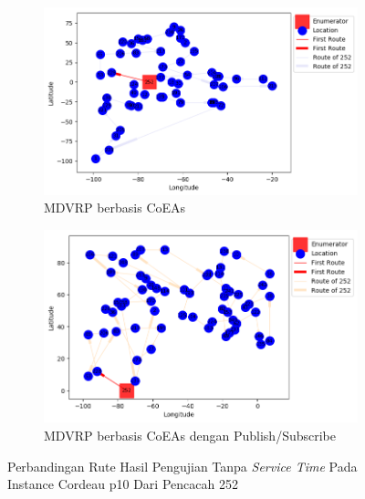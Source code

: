 \begin{figure}[H]
	\centering
	\begin{subfigure}[t]{\textwidth}
		\centering
		\includegraphics[width=\textwidth]{Resources/Images/cordeau_p10/cordeau_p10_notw_252_coes}
		\caption{MDVRP berbasis CoEAs}
		\label{fig:cordeau_p10_notw_252_coes}
	\end{subfigure}
	\begin{subfigure}[t]{\textwidth}
		\centering
		\includegraphics[width=\textwidth]{Resources/Images/cordeau_p10/cordeau_p10_notw_252_pubsub_coes}
		\caption{MDVRP berbasis CoEAs dengan Publish/Subscribe}
		\label{fig:cordeau_p10_notw_252_pubsub_coes}
	\end{subfigure}
	\caption{Perbandingan Rute Hasil Pengujian Tanpa \textit{Service Time} Pada Instance Cordeau p10 Dari Pencacah 252}
	\label{fig:cordeau_p10_notw_252}
\end{figure}


